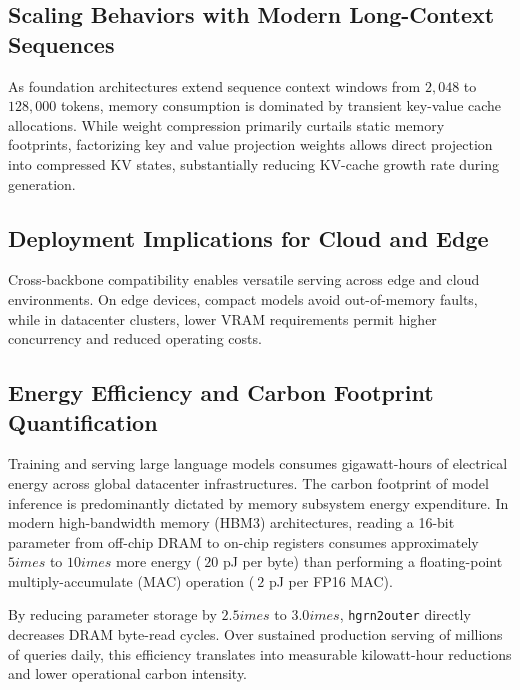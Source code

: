 \subsection{Scaling Behaviors with Modern Long-Context Sequences}
As foundation architectures extend sequence context windows from $2{,}048$ to $128{,}000$ tokens, memory consumption is dominated by transient key-value cache allocations. While weight compression primarily curtails static memory footprints, factorizing key and value projection weights allows direct projection into compressed KV states, substantially reducing KV-cache growth rate during generation.

\subsection{Deployment Implications for Cloud and Edge}
Cross-backbone compatibility enables versatile serving across edge and cloud environments. On edge devices, compact models avoid out-of-memory faults, while in datacenter clusters, lower VRAM requirements permit higher concurrency and reduced operating costs.

\subsection{Energy Efficiency and Carbon Footprint Quantification}
Training and serving large language models consumes gigawatt-hours of electrical energy across global datacenter infrastructures. The carbon footprint of model inference is predominantly dictated by memory subsystem energy expenditure. In modern high-bandwidth memory (HBM3) architectures, reading a 16-bit parameter from off-chip DRAM to on-chip registers consumes approximately $5	imes$ to $10	imes$ more energy ($~20$ pJ per byte) than performing a floating-point multiply-accumulate (MAC) operation ($~2$ pJ per FP16 MAC).

By reducing parameter storage by $2.5	imes$ to $3.0	imes$, \texttt{hgrn2outer} directly decreases DRAM byte-read cycles. Over sustained production serving of millions of queries daily, this efficiency translates into measurable kilowatt-hour reductions and lower operational carbon intensity.
